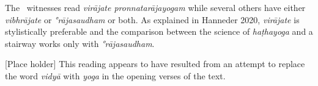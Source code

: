 \begin{ekdosis}
\begin{testimonia}[hp01_001]
\end{testimonia}

\begin{philcomm}[hp01_001]
The \textalpha\ witnesses read \emph{virājate pronnatarājayogam} while several others have either \emph{vibhrājate} or \emph{°rājasaudham} or both. As explained in Hanneder 2020, \emph{virājate} is stylistically preferable and the comparison between the science of \emph{haṭhayoga} and a stairway works only with \emph{°rājasaudham}.

[Place holder] This reading appears to have resulted from an attempt to replace the word \emph{vidyā} with \emph{yoga} in the opening verses of the text.



\end{philcomm}
\end{ekdosis}
